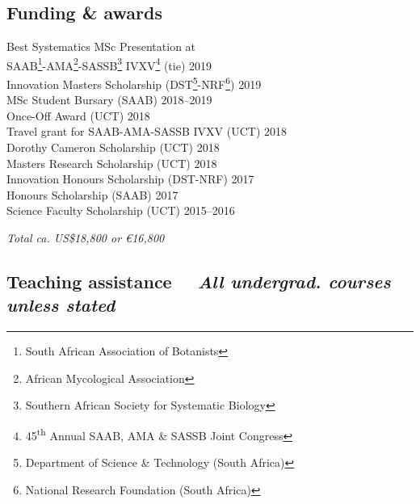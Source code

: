 \documentclass[10pt]{article}
\begin{document}
\begin{multicols}{2}

\subsection*{Funding \& awards} %

Best Systematics MSc Presentation at \\
\hspace{2em} SAAB\footnote{South African Association of Botanists}-AMA\footnote{
  African Mycological Association}-SASSB\footnote{Southern African Society for 
  Systematic Biology} IVXV\footnote{45\textsuperscript{th} Annual SAAB, AMA \& 
  SASSB Joint Congress} (tie)                                     \hfill 2019 \\
Innovation Masters Scholarship {\footnotesize (DST\footnote{Department of
  Science \& Technology (South Africa)}-NRF\footnote{National Research 
  Foundation (South Africa)})}                                    \hfill 2019 \\
MSc Student Bursary {\footnotesize (SAAB)}                  \hfill 2018--2019 \\
Once-Off Award {\footnotesize (UCT)}                              \hfill 2018 \\
Travel grant for SAAB-AMA-SASSB IVXV {\footnotesize (UCT)}        \hfill 2018 \\
Dorothy Cameron Scholarship {\footnotesize (UCT)}                 \hfill 2018 \\
Masters Research Scholarship {\footnotesize (UCT)}                \hfill 2018 \\
Innovation Honours Scholarship {\footnotesize (DST-NRF)}          \hfill 2017 \\
Honours Scholarship {\footnotesize (SAAB)}                        \hfill 2017 \\
Science Faculty Scholarship {\footnotesize (UCT)}              \hfill 2015--2016

\begin{center}
  \textit{Total ca. US\$18,800 or €16,800}
\end{center}

\columnbreak

\subsection*{Teaching assistance %
  ~~{\footnotesize \textmd{\textit{All undergrad. courses unless stated}}}}


\end{multicols}
\end{document}
